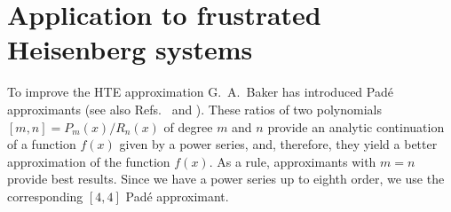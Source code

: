 \documentclass[aps,twocolumn,groupedaddress]{revtex4}
\begin{document}
\section{Application to frustrated Heisenberg
systems} \label{applic}

To improve the HTE approximation G.~A.~Baker has introduced  Pad\'e
approximants \cite{baker61} (see also
Refs.~ and ). These ratios of two
polynomials $[m,n]=P_m(x)/R_n(x)$ of degree $m$ and $n$ provide an
analytic continuation of a function $f(x)$ given by a power series, and,
therefore, they yield a better approximation of the function $f(x)$. As a rule,
approximants with $m=n$ provide best results.
Since we have a power series up to eighth order, we use the corresponding
$[4,4]$ Pad\'e approximant.
\end{document}
